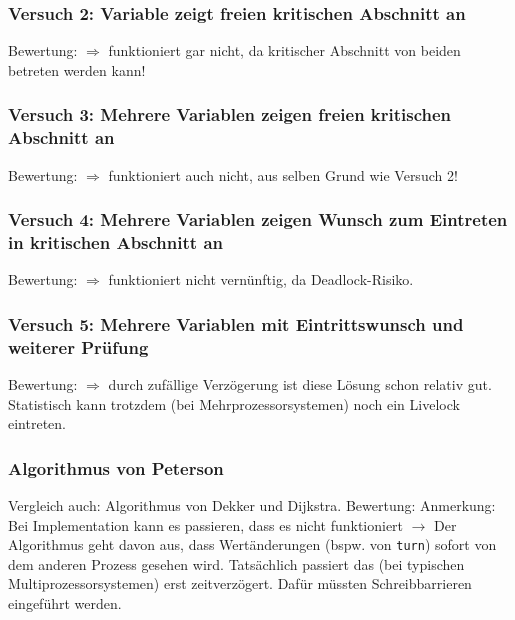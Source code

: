 \subsubsection{Versuch 2: Variable zeigt freien kritischen Abschnitt an}
Bewertung:
$\Rightarrow$ funktioniert gar nicht, da kritischer Abschnitt von beiden betreten werden kann!
\subsubsection{Versuch 3: Mehrere Variablen zeigen freien kritischen Abschnitt an}
Bewertung:
$\Rightarrow$ funktioniert auch nicht, aus selben Grund wie Versuch 2!
\subsubsection{Versuch 4: Mehrere Variablen zeigen Wunsch zum Eintreten in kritischen Abschnitt an}
Bewertung:
$\Rightarrow$ funktioniert nicht vernünftig, da Deadlock-Risiko.
\subsubsection{Versuch 5: Mehrere Variablen mit Eintrittswunsch und weiterer Prüfung}
Bewertung:
$\Rightarrow$ durch zufällige Verzögerung ist diese Lösung schon relativ gut. Statistisch kann trotzdem (bei Mehrprozessorsystemen) noch ein Livelock eintreten.
\subsubsection{Algorithmus von Peterson}
Vergleich auch: Algorithmus von Dekker und Dijkstra.
Bewertung:
Anmerkung: Bei Implementation kann es passieren, dass es nicht funktioniert $\to$ Der Algorithmus geht davon aus, dass Wertänderungen (bspw. von \lstinline$turn$) sofort von dem anderen Prozess gesehen wird. Tatsächlich passiert das (bei typischen Multiprozessorsystemen) erst zeitverzögert. Dafür müssten Schreibbarrieren eingeführt werden.




